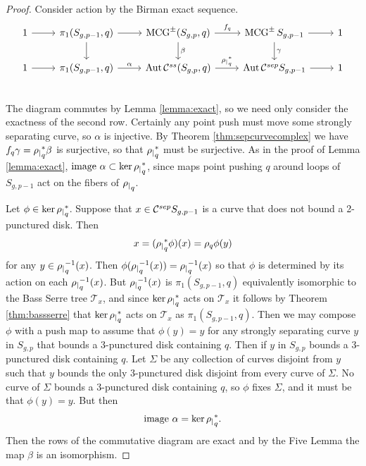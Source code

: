 \begin{proof}
  Consider action by the Birman exact sequence.
  $$
  \begin{tikzcd}
  1 \arrow[r]&
  \pi_1(S_{g,p-1},q) \arrow[r] \arrow[d]&
  \mcg^{\pm}(S_{g,p},q)  \arrow{r}{f_q} \arrow{d}{\beta}&
  \mcg^{\pm}S_{g,p-1} \arrow{r}  \arrow{d}{\gamma} &
  1 \\
  1 \arrow[r]&
  \pi_1(S_{g,p-1},q) \arrow{r}{\alpha}&
  \aaut \css (S_{g,p},q)  \arrow{r}{\rrho^\ast_{q}}&
  \aaut \csep S_{g,p-1} \arrow{r}&
  1 \\
  \end{tikzcd}
  $$
  The diagram commutes by Lemma \ref{lemma:exact}, so we need only consider the exactness of the second row.
  Certainly any point push must move some strongly separating curve, so $\alpha$ is injective.
  By Theorem \ref{thm:sepcurvecomplex} we have $f_q \gamma = {\rho_|}^\ast_q \beta$ is surjective,
  so that ${\rho_|}^\ast_q$ must be surjective.
  As in the proof of Lemma \ref{lemma:exact}, $\mbox{image } \alpha \subset \ker {\rho_|}^\ast_q$, since maps point pushing $q$
  around loops of $S_{g,p-1}$ act on the fibers of ${\rho_|}_q$.

  Let $\phi \in \ker {\rho_|}^\ast_q$.
  Suppose that $x \in  \mathcal C^{{sep}}  S_{g,p-1}$ is a curve that does not bound a 2-punctured disk.
  Then
  $$x=( {\rho_|}^\ast_q \phi)(x)= \rho_q \phi (y)$$
  for any $y \in {\rho_|}^{-1}_q(x)$.
  Then $\phi( {\rho_|}^{-1}_q(x) ) = {\rho_|}^{-1}_q(x)$
  so that $\phi$ is determined by its action on each ${\rho_|}^{-1}_q(x)$.
  But ${\rho_|}^{-1}_q(x)$ is $\pi_1(S_{g,p-1},q)$ equivalently isomorphic to the Bass Serre tree $\mathcal T_x$,
  and since $\ker {\rho_|}^\ast_q$ acts on $\mathcal T_x$ it follows by Theorem \ref{thm:bassserre} that
  $\ker {\rho_|}^\ast_q$ acts on $\mathcal T_x$ as $\pi_1(S_{g,p-1},q)$.
  Then we may compose $\phi$ with a push map to assume that $\phi(y)=y$
  for any strongly separating curve $y$ in $S_{g,p}$ that bounds a 3-punctured disk containing $q$.
  Then if $y$ in $S_{g,p}$ bounds a 3-punctured disk containing $q$.
  Let $\Sigma$ be any collection of curves disjoint from $y$ such that $y$ bounds the only
  3-punctured disk disjoint from every curve of $\Sigma$.
  No curve of $\Sigma$ bounds a 3-punctured disk containing $q$, so $\phi$
  fixes $\Sigma$, and it must be that $\phi(y)=y$.
  But then
   $$\mbox{image } \alpha = \ker {\rho_|}^\ast_q.$$
  Then the rows of the commutative diagram are exact and by the Five Lemma the map $\beta$ is an isomorphism.
\end{proof}


